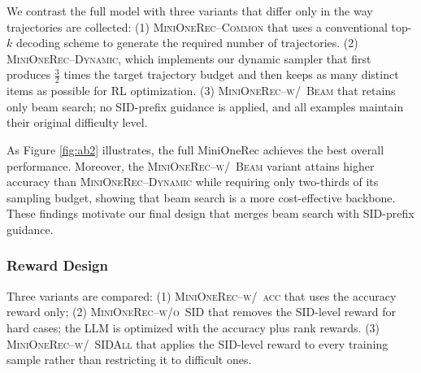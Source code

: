 We contrast the full model with three variants that differ only in the way trajectories are collected:
(1) \textsc{MiniOneRec}--\textsc{Common} that uses a conventional top-$k$ decoding scheme to generate the required number of trajectories.
(2) \textsc{MiniOneRec}--\textsc{Dynamic}, which implements our dynamic sampler that first produces $\tfrac32$ times the target trajectory budget and then keeps as many distinct items as possible for RL optimization.
(3) \textsc{MiniOneRec}--\textsc{w/~Beam} that retains only beam search; no SID-prefix guidance is applied, and all examples maintain their original difficulty level.

As Figure \ref{fig:ab2} illustrates, the full MiniOneRec achieves the best overall performance. Moreover, the \textsc{MiniOneRec}--\textsc{w/~Beam} variant attains higher accuracy than \textsc{MiniOneRec}--\textsc{Dynamic} while requiring only two-thirds of its sampling budget, showing that beam search is a more cost-effective backbone. These findings motivate our final design that merges beam search with SID-prefix guidance.

\subsubsection{Reward Design}

Three variants are compared:
(1) \textsc{MiniOneRec}--\textsc{w/~acc} that uses the accuracy reward only;
(2) \textsc{MiniOneRec}--\textsc{w/o~SID} that removes the SID-level reward for hard cases; the LLM is optimized with the accuracy plus rank rewards.
(3) \textsc{MiniOneRec}--\textsc{w/~SIDAll} that applies the SID-level reward to every training sample rather than restricting it to difficult ones.

